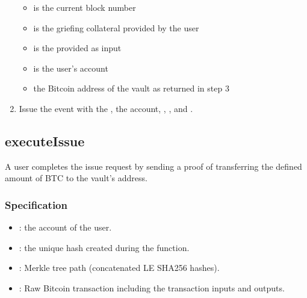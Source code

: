 \documentclass[a4paper,10pt,english]{sphinxmanual}
\begin{document}
\begin{enumerate}
\begin{itemize}
\item {} 
 is the current block number

\item {} 
 is the griefing collateral provided by the user

\item {} 
 is the  provided as input

\item {} 
 is the user’s account

\item {} 
 the Bitcoin address of the vault as returned in step 3

\end{itemize}

\item {} 
Issue the  event with the , the  account, , , and .

\end{enumerate}


\subsection{executeIssue}
\label{\detokenize{spec/issue:executeissue}}\label{\detokenize{spec/issue:id3}}
A user completes the issue request by sending a proof of transferring the defined amount of BTC to the vault’s address.


\subsubsection{Specification}
\label{\detokenize{spec/issue:id4}}


\begin{itemize}
\item {} 
: the account of the user.

\item {} 
: the unique hash created during the  function.

\item {} 
: Merkle tree path (concatenated LE SHA256 hashes).

\item {} 
: Raw Bitcoin transaction including the transaction inputs and outputs.

\end{itemize}
\end{document}
